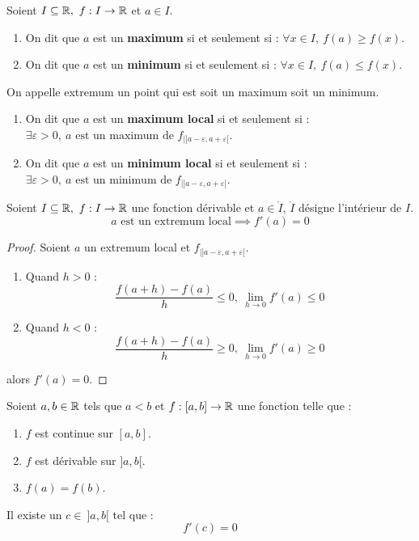 \begin{definition}
    Soient $I \subseteq \mathbb{R},\ f : I \to \mathbb{R}$ et $a \in I$.
    \begin{enumerate}
        \item On dit que $a$ est un \textbf{maximum} si et seulement si : $\forall x \in I,\ f(a) \geq f(x)$.
        \item On dit que $a$ est un \textbf{minimum} si et seulement si : $\forall x \in I,\ f(a) \leq f(x)$.
    \end{enumerate}
    On appelle extremum un point qui est soit un maximum soit un minimum.
    \begin{enumerate}
        \item On dit que $a$ est un \textbf{maximum local} si et seulement si : $\exists \varepsilon > 0,\ a \text{ est un maximum de } f_{|]a - \varepsilon, a + \varepsilon[}$.
        \item On dit que $a$ est un \textbf{minimum local} si et seulement si : $\exists \varepsilon > 0,\ a \text{ est un minimum de } f_{|]a - \varepsilon, a + \varepsilon[}$.
    \end{enumerate}
\end{definition}

\begin{theorem}
	Soient $I \subseteq \mathbb{R},\ f : I \to \mathbb{R}$ une fonction dérivable et $a \in \mathring{I}$, $\mathring{I}$ désigne l'intérieur de $I$. 
	\[ a \text{ est un extremum local} \implies f'(a) = 0 \]
\end{theorem}

\begin{proof}
	Soient $a$ un extremum local et $f_{|]a - \varepsilon, a + \varepsilon[}$.
	\\
	\begin{enumerate}
		\item Quand $h > 0$ : 
		\[ \frac{f(a + h) - f(a)}{h} \leq 0,\ \lim_{h \to 0} f'(a) \leq 0 \]
		\item Quand $h < 0$ :
		\[ \frac{f(a + h) - f(a)}{h} \geq 0,\ \lim_{h \to 0} f'(a) \geq 0 \]
	\end{enumerate}
	alors $f'(a) = 0$.
\end{proof}

\begin{theorem}
    Soient $a, b \in \mathbb{R}$ tels que $a < b$ et $f : [a, b] \to \mathbb{R}$ une fonction telle que :
    \begin{enumerate}
            \item $f$ est continue sur $[a, b]$.
            \item $f$ est dérivable sur $]a, b[$.
            \item $f(a) = f(b)$.
        \end{enumerate}
    \par \noindent Il existe un $c \in \ ]a, b[$ tel que : \[ f'(c) = 0 \]
\end{theorem}

